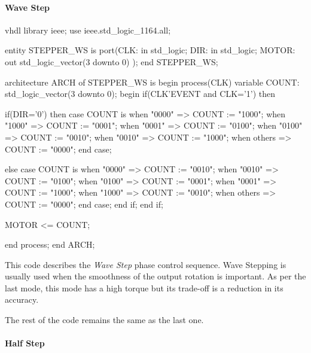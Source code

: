\paragraph{Wave Step}

\begin{code}{vhdl}
library ieee;
use ieee.std_logic_1164.all;

entity STEPPER_WS is
  port(CLK: in std_logic;
       DIR: in std_logic;
       MOTOR: out std_logic_vector(3 downto 0)
       );
end STEPPER_WS;

architecture ARCH of STEPPER_WS is
  begin
    process(CLK)
      variable COUNT: std_logic_vector(3 downto 0);
        begin
          if(CLK'EVENT and CLK='1') then

            if(DIR='0') then
              case COUNT is
                when "0000" => COUNT := "1000";
                when "1000" => COUNT := "0001";
                when "0001" => COUNT := "0100";
                when "0100" => COUNT := "0010";
                when "0010" => COUNT := "1000";
                when others => COUNT := "0000";
              end case;
              
                else
                  case COUNT is
                    when "0000" => COUNT := "0010";
                    when "0010" => COUNT := "0100";
                    when "0100" => COUNT := "0001";
                    when "0001" => COUNT := "1000";
                    when "1000" => COUNT := "0010";
                    when others => COUNT := "0000";
                  end case;
            end if;
          end if;
        
          MOTOR <= COUNT;
          
    end process;
end ARCH;
\end{code}

This code describes the \textit{Wave Step} phase control sequence. Wave Stepping is usually used when the smoothness of the output rotation is important. As per the last mode, this mode has a high torque but its trade-off is a reduction in its accuracy. \medskip

The rest of the code remains the same as the last one.

\paragraph{Half Step}

